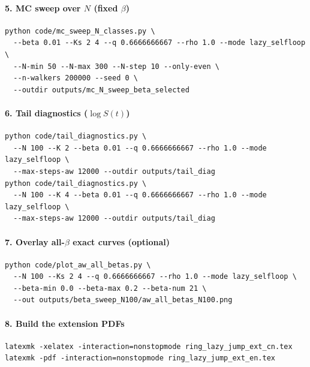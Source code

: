 \paragraph{5. MC sweep over \texorpdfstring{$N$}{N} (fixed \texorpdfstring{$\beta$}{beta})}
\begin{verbatim}
python code/mc_sweep_N_classes.py \
  --beta 0.01 --Ks 2 4 --q 0.6666666667 --rho 1.0 --mode lazy_selfloop \
  --N-min 50 --N-max 300 --N-step 10 --only-even \
  --n-walkers 200000 --seed 0 \
  --outdir outputs/mc_N_sweep_beta_selected
\end{verbatim}

\paragraph{6. Tail diagnostics (\texorpdfstring{$\log S(t)$}{log S(t)})}
\begin{verbatim}
python code/tail_diagnostics.py \
  --N 100 --K 2 --beta 0.01 --q 0.6666666667 --rho 1.0 --mode lazy_selfloop \
  --max-steps-aw 12000 --outdir outputs/tail_diag
python code/tail_diagnostics.py \
  --N 100 --K 4 --beta 0.01 --q 0.6666666667 --rho 1.0 --mode lazy_selfloop \
  --max-steps-aw 12000 --outdir outputs/tail_diag
\end{verbatim}

\paragraph{7. Overlay all-\texorpdfstring{$\beta$}{beta} exact curves (optional)}
\begin{verbatim}
python code/plot_aw_all_betas.py \
  --N 100 --Ks 2 4 --q 0.6666666667 --rho 1.0 --mode lazy_selfloop \
  --beta-min 0.0 --beta-max 0.2 --beta-num 21 \
  --out outputs/beta_sweep_N100/aw_all_betas_N100.png
\end{verbatim}

\paragraph{8. Build the extension PDFs}
\begin{verbatim}
latexmk -xelatex -interaction=nonstopmode ring_lazy_jump_ext_cn.tex
latexmk -pdf -interaction=nonstopmode ring_lazy_jump_ext_en.tex
\end{verbatim}
